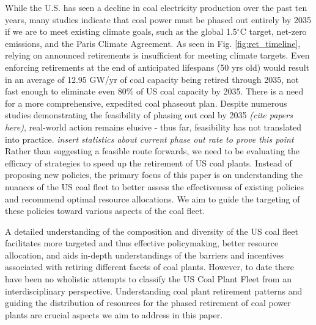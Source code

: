 While the U.S. has seen a decline in coal electricity production over the past ten years, many studies indicate that coal power must be phased out entirely by 2035 if we are to meet existing climate goals, such as the global 1.5$^\circ$C target, 
net-zero emissions, 
and the Paris Climate Agreement. As seen in Fig. \ref{fig:ret_timeline}, relying on announced retirements is insufficient for meeting climate targets.
Even enforcing retirements at the end of anticipated lifespans (50 yrs old) would result in an average of 12.95 GW/yr of coal capacity being retired through 2035,
not fast enough to eliminate even 80\% of US coal capacity by 2035.
There is a need for a more comprehensive, expedited coal phaseout plan.
Despite numerous studies demonstrating the feasibility of phasing out coal by 2035 \textit{(cite papers here)}, 
real-world action remains elusive - thus far, feasibility has not translated into practice. \textit{insert statistics about current phase out rate to prove this point} 
Rather than suggesting a feasible route forwards, we need to be evaluating the efficacy of strategies to speed up the retirement of US coal plants. 
Instead of proposing new policies, the primary focus of this paper is on understanding the nuances of the US coal fleet to better assess the effectiveness 
of existing policies and recommend optimal resource allocations. We aim to guide the targeting of these policies toward various aspects of the coal fleet.

A detailed understanding of the composition and
diversity of the US coal fleet facilitates more targeted and thus effective policymaking, better resource allocation, and aids in-depth
understandings of the barriers and incentives associated with retiring different facets of coal plants. However, to date there have been no wholistic attempts to
classify the US Coal Plant Fleet from an interdisciplinary perspective. Understanding coal plant retirement patterns 
and guiding the distribution of resources for the phased retirement of coal power plants are crucial aspects we aim to address in this paper.

